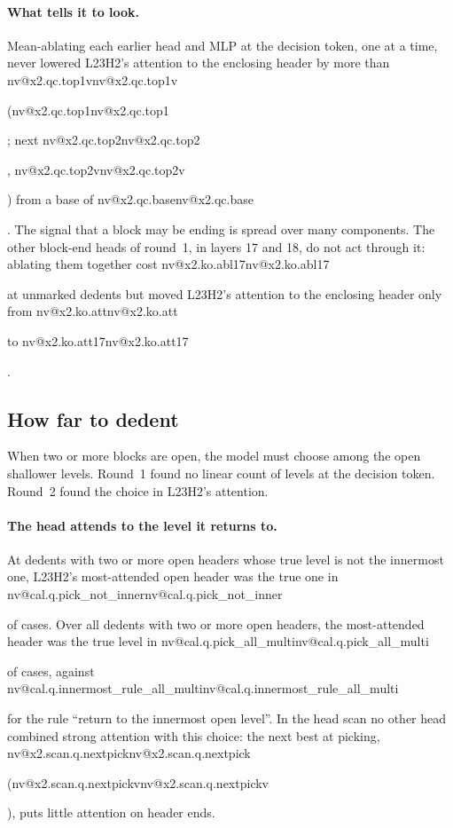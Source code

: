 \documentclass[11pt]{article}
\makeatletter
\newcommand{\nv}[1]{\ifcsname nv@#1\endcsname\csname nv@#1\endcsname\else\PackageError{numbers}{Unknown number key #1}{}\fi}
\newcommand{\hd}[2]{L#1H#2}
\makeatother
\begin{document}
\paragraph{What tells it to look.} Mean-ablating each earlier head and MLP at the decision token, one at a time, never lowered \hd{23}{2}'s attention to the enclosing header by more than \nv{x2.qc.top1v} (\nv{x2.qc.top1}; next \nv{x2.qc.top2}, \nv{x2.qc.top2v}) from a base of \nv{x2.qc.base}. The signal that a block may be ending is spread over many components. The other block-end heads of round~1, in layers 17 and 18, do not act through it: ablating them together cost \nv{x2.ko.abl17} at unmarked dedents but moved \hd{23}{2}'s attention to the enclosing header only from \nv{x2.ko.att} to \nv{x2.ko.att17}.

\subsection{How far to dedent}
\label{sec:howfar}

When two or more blocks are open, the model must choose among the open shallower levels. Round~1 found no linear count of levels at the decision token. Round~2 found the choice in \hd{23}{2}'s attention.

\paragraph{The head attends to the level it returns to.} At dedents with two or more open headers whose true level is not the innermost one, \hd{23}{2}'s most-attended open header was the true one in \nv{cal.q.pick_not_inner} of cases. Over all dedents with two or more open headers, the most-attended header was the true level in \nv{cal.q.pick_all_multi} of cases, against \nv{cal.q.innermost_rule_all_multi} for the rule ``return to the innermost open level''. In the head scan no other head combined strong attention with this choice: the next best at picking, \nv{x2.scan.q.nextpick} (\nv{x2.scan.q.nextpickv}), puts little attention on header ends.
\end{document}
